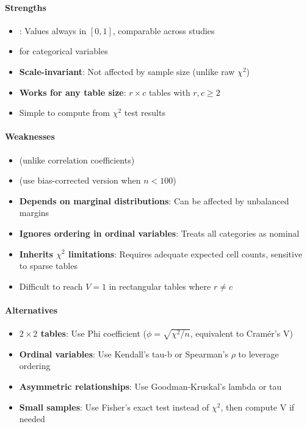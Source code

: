 \paragraph{Strengths}
\begin{itemize}
    \item {}: Values always in $[0, 1]$, comparable across studies
    \item {} for categorical variables
    \item \textbf{Scale-invariant}: Not affected by sample size (unlike raw $\chi^2$)
    \item \textbf{Works for any table size}: $r \times c$ tables with $r, c \geq 2$
    \item Simple to compute from $\chi^2$ test results
\end{itemize}

\paragraph{Weaknesses}
\begin{itemize}
    \item {} (unlike correlation coefficients)
    \item {} (use bias-corrected version when $n < 100$)
    \item \textbf{Depends on marginal distributions}: Can be affected by unbalanced margins
    \item \textbf{Ignores ordering in ordinal variables}: Treats all categories as nominal
    \item \textbf{Inherits $\chi^2$ limitations}: Requires adequate expected cell counts,
        sensitive to sparse tables
    \item Difficult to reach $V = 1$ in rectangular tables where $r \neq c$
\end{itemize}

\paragraph{Alternatives}
\begin{itemize}
    \item \textbf{$2 \times 2$ tables}: Use Phi coefficient ($\phi = \sqrt{\chi^2/n}$, equivalent to Cramér's V)
    \item \textbf{Ordinal variables}: Use Kendall's tau-b or Spearman's $\rho$ to leverage ordering
    \item \textbf{Asymmetric relationships}: Use Goodman-Kruskal's lambda or tau
    \item \textbf{Small samples}: Use Fisher's exact test instead of $\chi^2$, then compute V if needed
\end{itemize}

